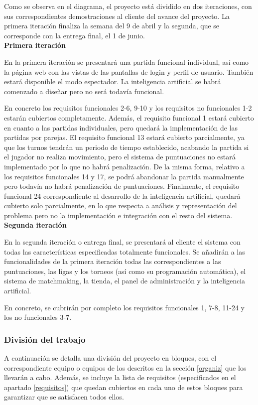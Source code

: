 Como se observa en el diagrama, el proyecto está dividido en dos iteraciones, con sus correspondientes demostraciones al cliente del avance del proyecto. La primera iteración finaliza la semana del 9 de abril y la segunda, que se corresponde con la entrega final, el 1 de junio.\\

\textbf{Primera iteración}

En la primera iteración se presentará una partida funcional individual, así como la página web con las vistas de las pantallas de login y perfil de usuario. También estará disponible el modo espectador. La inteligencia artificial se habrá comenzado a diseñar pero no será todavía funcional.

En concreto los requisitos funcionales 2-6, 9-10 y los requisitos no funcionales 1-2 estarán cubiertos completamente. Además, el requisito funcional 1 estará cubierto en cuanto a las partidas individuales, pero quedará la implementación de las partidas por parejas. El requisito funcional 13 estará cubierto parcialmente, ya que los turnos tendrán un periodo de tiempo establecido, acabando la partida si el jugador no realiza movimiento, pero el sistema de puntuaciones no estará implementado por lo que no habrá penalización. De la misma forma, relativo a los requisitos funcionales 14 y 17, se podrá abandonar la partida manualmente pero todavía no habrá penalización de puntuaciones. Finalmente, el requisito funcional 24 correspondiente al desarrollo de la inteligencia artificial, quedará cubierto solo parcialmente, en lo que respecta a análisis y representación del problema pero no la implementación e integración con el resto del sistema.\\

\textbf{Segunda iteración}

En la segunda iteración o entrega final, se presentará al cliente el sistema con todas las características especificadas totalmente funcionales. Se añadirán a las funcionalidades de la primera iteración todas las correspondientes a las puntuaciones, las ligas y los torneos (así como su programación automática), el sistema de matchmaking, la tienda, el panel de administración y la inteligencia artificial.

En concreto, se cubrirán por completo los requisitos funcionales 1, 7-8, 11-24 y los no funcionales 3-7.


\subsubsection*{División del trabajo}
\label{repartotrabajo}
A continuación se detalla una división del proyecto en bloques, con el correspondiente equipo o equipos de los descritos en la sección \ref{organiz} que los llevarán a cabo. Además, se incluye la lista de requisitos (especificados en el apartado \ref{requisitos}) que quedan cubiertos en cada uno de estos bloques para garantizar que se satisfacen todos ellos.

